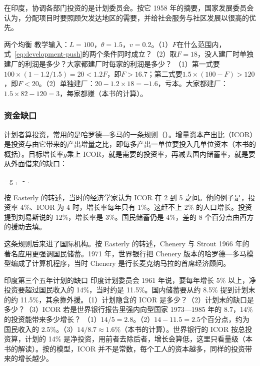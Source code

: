 在印度，协调各部门投资的是计划委员会。按它 1958 年的摘要，国家发展委员会认为，分配项目时要照顾欠发达地区的需要，并给社会服务与社区发展以很高的优先\cite{india1958}。

\begin{example}{两个均衡}\label{ex:development-push}
教学输入：$L=100$，$\theta=1.5$，$v=0.2$。（1）$F$在什么范围内，式~\eqref{eq:development-push}的两个条件同时成立？（2）取$F=18$，没人建厂时单独建厂的利润是多少？大家都建厂时每家的利润是多少？
\solution
（1）第一式要$100\times(1-1.2/1.5)=20<1.2F$，即$F>16.7$；第二式要$1.5\times(100-F)>120$，即$F<20$。（2）单独建厂：$20-1.2\times18=-1.6$，亏本。大家都建厂：$1.5\times82-120=3$，每家都赚（本书的计算）。
\end{example}

\subsubsection{资金缺口}

计划者算投资，常用的是哈罗德—多马的一条规则（）。增量资本产出比（ICOR）是投资与由它带来的产出增量之比，即每多产出一单位要投入几单位资本（本书的概括）。目标增长率$g$乘上 ICOR，就是需要的投资率，再减去国内储蓄率，就是要从外面借来的缺口：
\begin{keyeq}
=\times g ,\qquad {}=- .\label{eq:development-gap}
\end{keyeq}
按 Easterly 的转述，当时的经济学家认为 ICOR 在 2 到 5 之间\cite{easterly1997}。他的例子是，投资率 4\%、ICOR 为 4 时，增长率每年只有 1\%\cite{easterly1997}。这赶不上 2\% 的人口增长。投资提到刘易斯说的 12\%，增长率是 3\%\cite{easterly1997}。国民储蓄仍是 4\%，差的 8 个百分点由西方的援助去填\cite{easterly1997}。

这条规则后来进了国际机构。按 Easterly 的转述，Chenery 与 Strout 1966 年的著名应用更强调国民储蓄\cite{easterly1997}。1971 年，世界银行把 Chenery 版本的哈罗德—多马模型编成了计算机程序，当时 Chenery 是行长麦克纳马拉的首席经济顾问\cite{easterly1997}。

\begin{example}{印度第三个五年计划的缺口}\label{ex:development-gap}
印度计划委员会 1961 年说，要每年增长 5\% 以上，净投资要超过国民收入的 14\%，当时约是 11.5\%\cite{india1961}。国内储蓄要从约 8.5\% 提到计划末的约 11.5\%，其余靠外援\cite{india1961}。（1）计划隐含的 ICOR 是多少？（2）计划末的缺口是多少？（3）ICOR 若是世界银行报告里强内向型国家 1973—1985 年的 8.7，14\% 的投资能带来多少增长？
\solution
（1）$14/5=2.8$。（2）$14-11.5=2.5$个百分点，约为国民收入的 2.5\%。（3）$14/8.7\approx1.6\%$（本书的计算）\cite{wdr1987}。世界银行的 ICOR 按总投资算，计划的 14\% 是净投资，用前者去除后者，增长会算低，这里只看量级（本书的解读）\cite{wdr1987,india1961}。按的模型，ICOR 并不是常数，每个工人的资本越多，同样的投资带来的增长越少。
\end{example}

